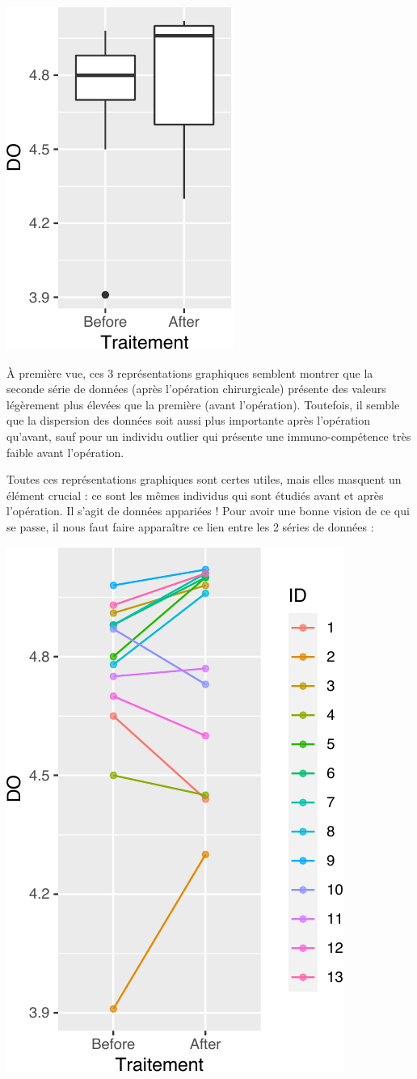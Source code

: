 \documentclass[
  a4paper,
]{article}
\newenvironment{Shaded}{\begin{snugshade}}{\end{snugshade}}
\newcommand{\DataTypeTok}[1]{\textcolor[rgb]{0.00,0.34,0.68}{#1}}
\newcommand{\FloatTok}[1]{\textcolor[rgb]{0.69,0.50,0.00}{#1}}
\newcommand{\KeywordTok}[1]{\textcolor[rgb]{0.12,0.11,0.11}{\textbf{#1}}}
\newcommand{\NormalTok}[1]{\textcolor[rgb]{0.12,0.11,0.11}{#1}}
\newcommand{\OperatorTok}[1]{\textcolor[rgb]{0.12,0.11,0.11}{#1}}
\newcommand{\StringTok}[1]{\textcolor[rgb]{0.75,0.01,0.01}{#1}}
\begin{document}
\begin{center}\includegraphics[width=0.25\linewidth]{figure/unnamed-chunk-35-1} \end{center}

À première vue, ces 3 représentations graphiques semblent montrer que la seconde série de données (après l'opération chirurgicale) présente des valeurs légèrement plus élevées que la première (avant l'opération). Toutefois, il semble que la dispersion des données soit aussi plus importante après l'opération qu'avant, sauf pour un individu outlier qui présente une immuno-compétence très faible avant l'opération.

Toutes ces représentations graphiques sont certes utiles, mais elles masquent un élément crucial : ce sont les mêmes individus qui sont étudiés avant et après l'opération. Il s'agit de données appariées ! Pour avoir une bonne vision de ce qui se passe, il nous faut faire apparaître ce lien entre les 2 séries de données :

\begin{Shaded}
\end{Shaded}

\begin{center}\includegraphics[width=0.33\linewidth]{figure/unnamed-chunk-36-1} \end{center}
\end{document}
